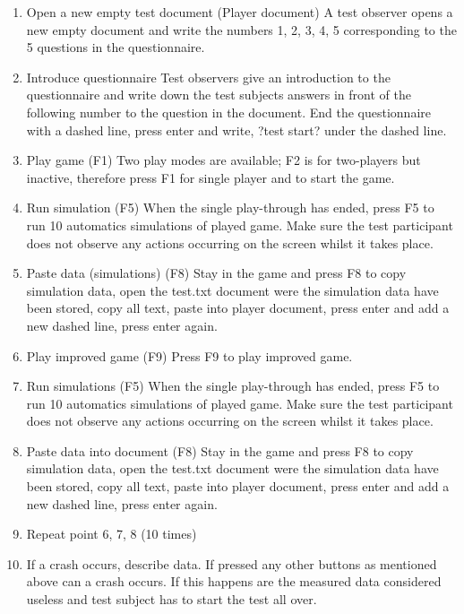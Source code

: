 \begin{enumerate}
\item	Open a new empty test document (Player document)
A test observer opens a new empty document and write the numbers 1, 2, 3, 4, 5 corresponding to the 5 questions in the questionnaire.

\item Introduce questionnaire
Test observers give an introduction to the questionnaire and write down the test subjects answers in front of the following number to the question in the document.
End the questionnaire with a dashed line, press enter and write, ?test start? under the dashed line.

\item Play game (F1)
Two play modes are available; F2 is for two-players but inactive, therefore press F1 for single player and to start the game.

\item Run simulation (F5)
When the single play-through has ended, press F5 to run 10 automatics simulations of played game. Make sure the test participant does not observe any actions occurring on the screen whilst it takes place.

\item Paste data (simulations) (F8)
Stay in the game and press F8 to copy simulation data, open the test.txt document were the simulation data have been stored, copy all text, paste into player document, press enter and add a new dashed line, press enter again.

\item Play improved game (F9)
Press F9 to play improved game.

\item Run simulations (F5)
When the single play-through has ended, press F5 to run 10 automatics simulations of played game. Make sure the test participant does not observe any actions occurring on the screen whilst it takes place.

\item Paste data into document (F8)
Stay in the game and press F8 to copy simulation data, open the test.txt document were the simulation data have been stored, copy all text, paste into player document, press enter and add a new dashed line, press enter again.

\item Repeat point 6, 7, 8 (10 times)

\item If a crash occurs, describe data.
If pressed any other buttons as mentioned above can a crash occurs. If this happens are the measured data considered useless and test subject has to start the test all over.
 \end{enumerate}

